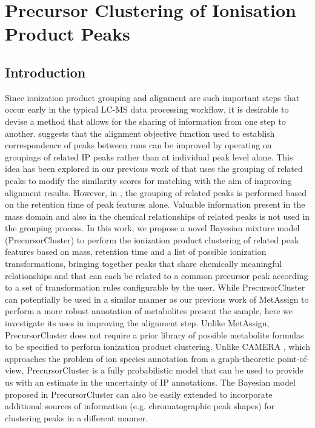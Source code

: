 \chapter{Precursor Clustering of Ionisation Product Peaks}
\label{c:background}


\section{Introduction}

Since ionization product grouping and alignment are such important steps that occur early in the typical LC-MS data processing workflow, it is desirable to devise a method that allows for the sharing of information from one step to another. \cite{Smith2015} suggests that the alignment objective function used to establish correspondence of peaks between runs can be improved by operating on groupings of related IP peaks rather than at individual peak level alone. This idea has been explored in our previous work of \cite{Wandy2015} that uses the grouping of related peaks to modify the similarity scores for matching with the aim of improving alignment results. However, in \cite{Wandy2015}, the grouping of related peaks is performed based on the retention time of peak features alone. Valuable information present in the mass domain and also in the chemical relationships of related peaks is not used in the grouping process. In this work, we propose a novel Bayesian mixture model (PrecursorCluster) to perform the ionization product clustering of related peak features based on mass, retention time and a list of possible ionization transformations, bringing together peaks that share chemically meaningful relationships and that can each be related to a common precursor peak according to a set of transformation rules configurable by the user. While PrecursorCluster can potentially be used in a similar manner as our previous work of MetAssign \cite{Daly2014} to perform a more robust annotation of metabolites present the sample, here we investigate its uses in improving the alignment step. Unlike MetAssign, PrecursorCluster does not require a prior library of possible metabolite formulas to be specified to perform ionization product clustering. Unlike CAMERA \cite{Kuhl2012}, which approaches the problem of ion species annotation from a graph-theoretic point-of-view, PrecursorCluster is a fully probabilistic model that can be used to provide us with an estimate in the uncertainty of IP annotations. The Bayesian model proposed in PrecursorCluster can also be easily extended to incorporate additional sources of information (e.g. chromatographic peak shapes) for clustering peaks in a different manner.

